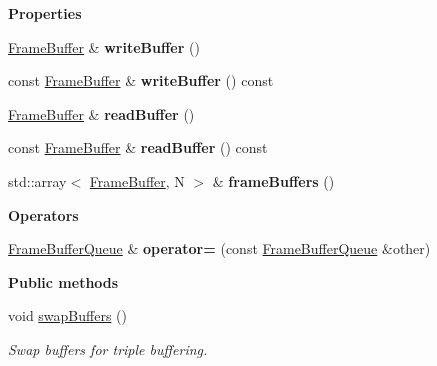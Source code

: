 \begin{Indent}\textbf{ Properties}\par
\begin{DoxyCompactItemize}
\item 
\mbox{\label{classrev_1_1_frame_buffer_queue_a63e1fae80fedf002e7f475a809e4ad35}} 
\mbox{\hyperlink{classrev_1_1_frame_buffer}{Frame\+Buffer}} \& {\bfseries write\+Buffer} ()
\item 
\mbox{\label{classrev_1_1_frame_buffer_queue_a2198c23e3b732c7e6ba57b8b502f0bbc}} 
const \mbox{\hyperlink{classrev_1_1_frame_buffer}{Frame\+Buffer}} \& {\bfseries write\+Buffer} () const
\item 
\mbox{\label{classrev_1_1_frame_buffer_queue_a8dbafa162152de5da224997b8f3afa0d}} 
\mbox{\hyperlink{classrev_1_1_frame_buffer}{Frame\+Buffer}} \& {\bfseries read\+Buffer} ()
\item 
\mbox{\label{classrev_1_1_frame_buffer_queue_ac663c14477382200d62a4c3e4d71405e}} 
const \mbox{\hyperlink{classrev_1_1_frame_buffer}{Frame\+Buffer}} \& {\bfseries read\+Buffer} () const
\item 
\mbox{\label{classrev_1_1_frame_buffer_queue_a3068a3f925b9e94b96ecb2f82ac8df27}} 
std\+::array$<$ \mbox{\hyperlink{classrev_1_1_frame_buffer}{Frame\+Buffer}}, N $>$ \& {\bfseries frame\+Buffers} ()
\end{DoxyCompactItemize}
\end{Indent}
\begin{Indent}\textbf{ Operators}\par
\begin{DoxyCompactItemize}
\item 
\mbox{\label{classrev_1_1_frame_buffer_queue_aa4286414d8aa798cb2a5c3afb96827a6}} 
\mbox{\hyperlink{classrev_1_1_frame_buffer_queue}{Frame\+Buffer\+Queue}} \& {\bfseries operator=} (const \mbox{\hyperlink{classrev_1_1_frame_buffer_queue}{Frame\+Buffer\+Queue}} \&other)
\end{DoxyCompactItemize}
\end{Indent}
\begin{Indent}\textbf{ Public methods}\par
\begin{DoxyCompactItemize}
\item 
\mbox{\label{classrev_1_1_frame_buffer_queue_addbfe2127fb195899688b8cfc889aabf}} 
void \mbox{\hyperlink{classrev_1_1_frame_buffer_queue_addbfe2127fb195899688b8cfc889aabf}{swap\+Buffers}} ()
\begin{DoxyCompactList}\small\item\em Swap buffers for triple buffering. \end{DoxyCompactList}\end{DoxyCompactItemize}
\end{Indent}
